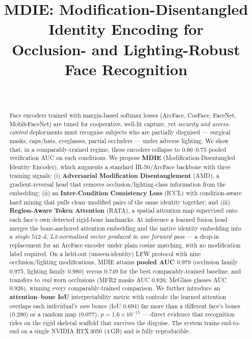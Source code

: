 \documentclass[10pt,conference]{IEEEtran}
\title{MDIE: Modification-Disentangled Identity Encoding for\\
       Occlusion- and Lighting-Robust Face Recognition}
\author{\IEEEauthorblockN{Anonymous Submission}\\
        \IEEEauthorblockA{Manuscript under review}}
\begin{document}
\maketitle

\begin{abstract}
Face encoders trained with margin-based softmax losses (ArcFace, CosFace,
FaceNet, MobileFaceNet) are tuned for cooperative, well-lit capture, yet
\emph{security and access-control} deployments must recognise subjects who are
partially disguised --- surgical masks, caps/hats, eyeglasses, partial
occluders --- under adverse lighting. We show that, in a comparably-trained
regime, these encoders collapse to $0.60$--$0.75$ pooled verification AUC on
such conditions. We propose \textbf{MDIE} (Modification-Disentangled Identity
Encoder), which augments a standard IR-50/ArcFace backbone with three training
signals: (i) \textbf{Adversarial Modification Disentanglement} (AMD), a
gradient-reversal head that removes occlusion/lighting-class information from
the embedding; (ii) an \textbf{Inter-Condition Consistency Loss} (ICCL) with
condition-aware hard mining that pulls clean--modified pairs of the same
identity together; and (iii) \textbf{Region-Aware Token Attention} (RATA), a
spatial attention map supervised onto each face's own detected rigid-bone
landmarks. At inference a learned fusion head merges the bone-anchored
attention embedding and the native identity embedding into a \emph{single
$512$-d, L2-normalised vector produced in one forward pass} --- a drop-in
replacement for an ArcFace encoder under plain cosine matching, with no
modification label required. On a held-out (unseen-identity) LFW protocol with
nine occlusion/lighting modifications, MDIE attains \textbf{pooled AUC $0.979$}
(occlusion family $0.975$, lighting family $0.980$) versus $0.749$ for the best
comparably-trained baseline, and transfers to \emph{real} worn occlusions
(MFR2 masks AUC $0.826$; MeGlass glasses AUC $0.926$), winning every
comparably-trained comparison. We further introduce an \textbf{attention--bone
IoU} interpretability metric with controls: the learned attention overlaps each
individual's \emph{own} bones (IoU $0.694$) far more than a different face's
bones ($0.280$) or a random map ($0.077$), $p\!=\!1.6\!\times\!10^{-15}$ ---
direct evidence that recognition rides on the rigid skeletal scaffold that
survives the disguise. The system trains end-to-end on a single NVIDIA
RTX\,3050 (4\,GB) and is fully reproducible.
\end{abstract}
\end{document}

